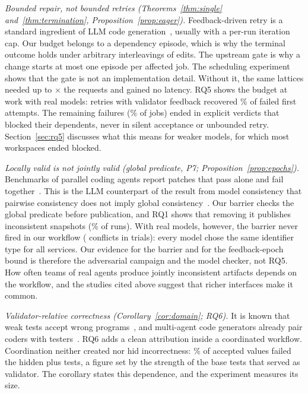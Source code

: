 \emph{Bounded repair, not bounded retries (Theorems~\ref{thm:single} and~\ref{thm:termination}, Proposition~\ref{prop:eager}).} Feedback-driven retry is a standard ingredient of LLM code generation~\cite{madaan2023selfrefine,shinn2023reflexion,chen2024selfdebug,huang2023agentcoder,schafer2024testpilot}, usually with a per-run iteration cap. Our budget belongs to a dependency episode, which is why the terminal outcome holds under arbitrary interleavings of edits. The upstream gate is why a change starts at most one episode per affected job. The scheduling experiment shows that the gate is not an implementation detail. Without it, the same lattices needed up to \SchedEagerReqRatioMax$\times$ the requests and gained no latency. RQ5 shows the budget at work with real models: retries with validator feedback recovered \LlmFeedbackRecoveredPct\% of failed first attempts. The remaining failures (\LlmJobsFailedPct\% of jobs) ended in explicit verdicts that blocked their dependents, never in silent acceptance or unbounded retry. Section~\ref{sec:rq5} discusses what this means for weaker models, for which most workspaces ended blocked.

\emph{Locally valid is not jointly valid (global predicate, P7; Proposition~\ref{prop:epochs}).} Benchmarks of parallel coding agents report patches that pass alone and fail together~\cite{xia2026stale,khatua2026cooperbench}. This is the LLM counterpart of the result from model consistency that pairwise consistency does not imply global consistency~\cite{stevens}. Our barrier checks the global predicate before publication, and RQ1 shows that removing it publishes inconsistent snapshots (\GlobalPublishPct\% of runs). With real models, however, the barrier never fired in our workflow (\LlmBarrierConflicts{} conflicts in \LlmTrials{} trials): every model chose the same identifier type for all services. Our evidence for the barrier and for the feedback-epoch bound is therefore the adversarial campaign and the model checker, not RQ5. How often teams of real agents produce jointly inconsistent artifacts depends on the workflow, and the studies cited above suggest that richer interfaces make it common.

\emph{Validator-relative correctness (Corollary~\ref{cor:domain}; RQ6).} It is known that weak tests accept wrong programs~\cite{evalplus}, and multi-agent code generators already pair coders with testers~\cite{dong2024selfcollab,huang2023agentcoder,chen2023codet}. RQ6 adds a clean attribution inside a coordinated workflow. Coordination neither created nor hid incorrectness: \BenchAcceptedWrongPct\% of accepted values failed the hidden plus tests, a figure set by the strength of the base tests that served as validator. The corollary states this dependence, and the experiment measures its size.

